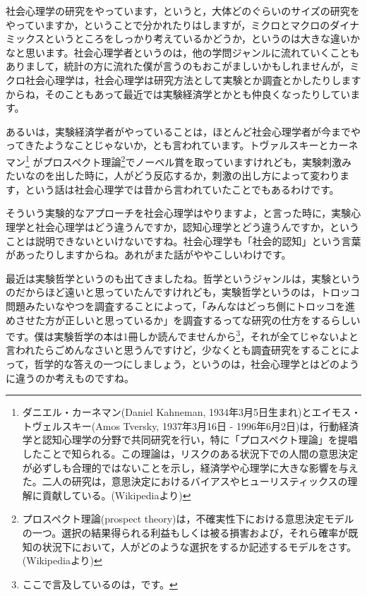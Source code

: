 \documentclass{ltjsbook}
\begin{document}
社会心理学の研究をやっています，というと，大体どのぐらいのサイズの研究をやっていますか，ということで分かれたりはしますが，ミクロとマクロのダイナミックスというところをしっかり考えているかどうか，というのは大きな違いかなと思います。社会心理学者というのは，他の学問ジャンルに流れていくこともありまして，統計の方に流れた僕が言うのもおこがましいかもしれませんが，ミクロ社会心理学は，社会心理学は研究方法として実験とか調査とかしたりしますからね，そのこともあって最近では実験経済学とかとも仲良くなったりしています。

あるいは，実験経済学者がやっていることは，ほとんど社会心理学者が今までやってきたようなことじゃないか，とも言われています。トヴァルスキーとカーネマン\footnote{ダニエル・カーネマン(Daniel Kahneman, 1934年3月5日生まれ)とエイモス・トヴェルスキー(Amos Tversky, 1937年3月16日 - 1996年6月2日)は，行動経済学と認知心理学の分野で共同研究を行い，特に「プロスペクト理論」を提唱したことで知られる。この理論は，リスクのある状況下での人間の意思決定が必ずしも合理的ではないことを示し，経済学や心理学に大きな影響を与えた。二人の研究は，意思決定におけるバイアスやヒューリスティックスの理解に貢献している。(Wikipediaより)}
がプロスペクト理論\footnote{プロスペクト理論(prospect theory)は，不確実性下における意思決定モデルの一つ。選択の結果得られる利益もしくは被る損害および，それら確率が既知の状況下において，人がどのような選択をするか記述するモデルをさす。(Wikipediaより)}でノーベル賞を取っていますけれども，実験刺激みたいなのを出した時に，人がどう反応するか，刺激の出し方によって変わります，という話は社会心理学では昔から言われていたことでもあるわけです。

そういう実験的なアプローチを社会心理学はやりますよ，と言った時に，実験心理学と社会心理学はどう違うんですか，認知心理学とどう違うんですか，ということは説明できないといけないですね。社会心理学も「社会的認知」という言葉があったりしますからね。あれがまた話がややこしいわけです。

最近は実験哲学というのも出てきましたね。哲学というジャンルは，実験というのだからほど遠いと思っていたんですけれども，実験哲学というのは，トロッコ問題みたいなやつを調査することによって，「みんなはどっち側にトロッコを進めさせた方が正しいと思っているか」を調査するってな研究の仕方をするらしいです。僕は実験哲学の本は1冊しか読んでませんから\footnote{ここで言及しているのは，\textcite{SPjikkentetugaku}です。}，それが全てじゃないよと言われたらごめんなさいと思うんですけど，少なくとも調査研究をすることによって，哲学的な答えの一つにしましょう，というのは，社会心理学とはどのように違うのか考えものですね。
\end{document}
